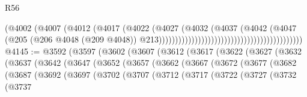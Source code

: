 \begin{lexlean}{R56}
\begin{coremodule}
{{{{{{{{{{{{{{{{{{{{{{{{{{{{{{{{{{{{{{{{{{{{{{{{{{{{{{{{{{{{{{{{{{{{{{{{{{{{{{{{{{{{{{{{{{{{{{{{{{{{{{{{{{{{{{{{{{{{{{{{{{{{{{{{{{{{{{{{{{{{{{{{{{{{{{{{{{{{{{{{{{{{{{{{{{{{{{{{{{{{{{{{{{{{{{{{{{{{{{{{{{{{{{{{{{{                                                                      (@4002
                                                                        (@4007
                                                                          (@4012
                                                                            (@4017
                                                                              (@4022
                                                                                (@4027
                                                                                  (@4032
                                                                                    (@4037
                                                                                      (@4042
                                                                                        (@4047
                                                                                          (@205
                                                                                            (@206
                                                                                              @4048
                                                                                              (@209
                                                                                                @4048))
                                                                                            @213))))))))))))))))))))))))))))))))))))))))))))
@4145 := @3592
    (@3597
      (@3602
        (@3607
          (@3612
            (@3617
              (@3622
                (@3627
                  (@3632
                    (@3637
                      (@3642
                        (@3647
                          (@3652
                            (@3657
                              (@3662
                                (@3667
                                  (@3672
                                    (@3677
                                      (@3682
                                        (@3687
                                          (@3692
                                            (@3697
                                              (@3702
                                                (@3707
                                                  (@3712
                                                    (@3717
                                                      (@3722
                                                        (@3727
                                                          (@3732
                                                            (@3737
}}}}}}}}}}}}}}}}}}}}}}}}}}}}}}}}}}}}}}}}}}}}}}}}}}}}}}}}}}}}}}}}}}}}}}}}}}}}}}}}}}}}}}}}}}}}}}}}}}}}}}}}}}}}}}}}}}}}}}}}}}}}}}}}}}}}}}}}}}}}}}}}}}}}}}}}}}}}}}}}}}}}}}}}}}}}}}}}}}}}}}}}}}}}}}}}}}}}}}}}}}}}}}}}}}}
\end{coremodule}
\end{lexlean}
